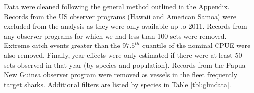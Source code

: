 Data were cleaned following the general method outlined in the Appendix. Records from the US observer programs (Hawaii and American Samoa) were excluded from the analysis as they were only available up to 2011. Records from any observer programs for which we had less than 100 sets were removed. Extreme catch events greater than the $97.5^{th}$ quantile of the nominal CPUE were also removed. Finally, year effects were only estimated if there were at least 50 sets observed in that year (by species and population).  Records from the Papua New Guinea observer program were removed as vessels in the fleet frequently target sharks. Additional filters are listed by species in Table \ref{tbl:glmdata}.
                                                                                      
                                                                                       
